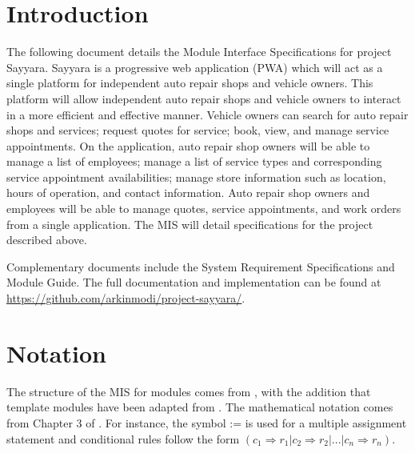 \documentclass[12pt, titlepage]{article}
\begin{document}
\newpage

\tableofcontents

\newpage

\listoftables

\listoffigures

\newpage


\section{Introduction}

The following document details the Module Interface Specifications for project Sayyara. Sayyara is
a progressive web application (PWA) which will act as a single platform for independent auto repair
shops and vehicle owners. This platform will allow independent auto repair shops and vehicle owners
to interact in a more efficient and effective manner. Vehicle owners can search for auto repair
shops and services; request quotes for service; book, view, and manage service appointments. On the
application, auto repair shop owners will be able to manage a list of employees; manage a list of
service types and corresponding service appointment availabilities; manage store information such
as location, hours of operation, and contact information. Auto repair shop owners and employees
will be able to manage quotes, service appointments, and work orders from a single application. The
MIS will detail specifications for the project described above.

Complementary documents include the System Requirement Specifications and Module Guide. The full
documentation and implementation can be found at
\url{https://github.com/arkinmodi/project-sayyara/}.

\section{Notation}


The structure of the MIS for modules comes from \citet{HoffmanAndStrooper1995}, with the addition
that template modules have been adapted from \cite{GhezziEtAl2003}. The mathematical notation comes
from Chapter 3 of \citet{HoffmanAndStrooper1995}. For instance, the symbol := is used for a
multiple assignment statement and conditional rules follow the form $(c_1 \Rightarrow r_1 | c_2
	\Rightarrow r_2 | ... | c_n \Rightarrow r_n )$.
\end{document}

